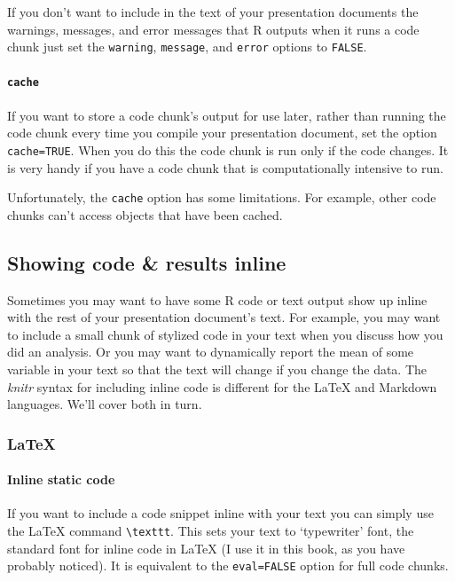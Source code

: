 If you don't want to include in the text of your presentation documents the warnings, messages, and error messages that R outputs when it runs a code chunk just set the \texttt{warning}, \texttt{message}, and \texttt{error} options to \texttt{FALSE}.

\paragraph{{\tt{cache}}}

If you want to store a code chunk's output for use later, rather than running the code chunk every time you compile your presentation document, set the option \texttt{cache=TRUE}. When you do this the code chunk is run only if the code changes. It is very handy if you have a code chunk that is computationally intensive to run. 

Unfortunately, the \texttt{cache} option has some limitations. For example, other code chunks can't access objects that have been cached.

\subsection{Showing code \& results inline}

Sometimes you may want to have some R code or text output show up inline with the rest of your presentation document's text. For example, you may want to include a small chunk of stylized code in your text when you discuss how you did an analysis. Or you may want to dynamically report the mean of some variable in your text so that the text will change if you change the data. The {\emph{knitr}} syntax for including inline code is different for the LaTeX and Markdown languages. We'll cover both in turn.

\subsubsection{LaTeX}

\paragraph{Inline static code}

If you want to include a code snippet inline with your text you can simply use the LaTeX command  \texttt{\textbackslash{}texttt}. This sets your text to `typewriter' font, the standard font for inline code in LaTeX (I use it in this book, as you have probably noticed). It is equivalent to the \texttt{eval=FALSE} option for full code chunks. 

